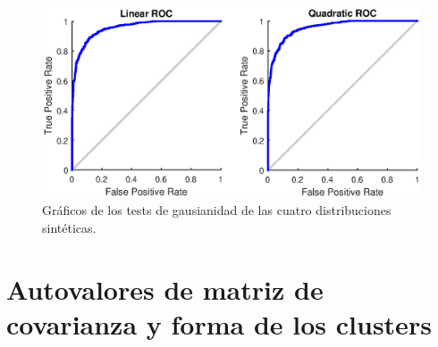 \documentclass[11pt]{article} %
\begin{document}
\begin{figure}[h]
	\centering
	\includegraphics[width=\textwidth]{ROC_-3.eps}
	\caption[]{\small Gráficos de los tests de gausianidad de las cuatro distribuciones sintéticas.} 
	\label{fig:p1:roc:-3}
\end{figure}

\section[Parte 2 - Autovalor]{Autovalores de matriz de covarianza y
	forma de los clusters}
\end{document}
